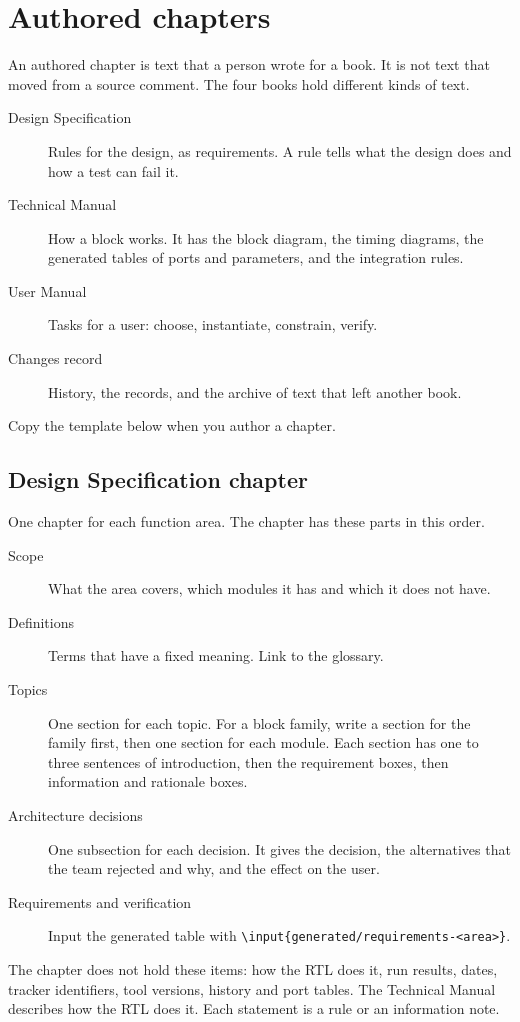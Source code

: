\section{Authored chapters}\label{um:guide:authored-chapters}
An authored chapter is text that a person wrote for a book. It is not text that moved from a source comment. The four books hold different kinds of text.
\begin{description}
  \item[Design Specification] Rules for the design, as requirements. A rule tells what the design does and how a test can fail it.
  \item[Technical Manual] How a block works. It has the block diagram, the timing diagrams, the generated tables of ports and parameters, and the integration rules.
  \item[User Manual] Tasks for a user: choose, instantiate, constrain, verify.
  \item[Changes record] History, the records, and the archive of text that left another book.
\end{description}
Copy the template below when you author a chapter.

\subsection{Design Specification chapter}
One chapter for each function area. The chapter has these parts in this order.
\begin{description}
  \item[Scope] What the area covers, which modules it has and which it does not have.
  \item[Definitions] Terms that have a fixed meaning. Link to the glossary.
  \item[Topics] One section for each topic. For a block family, write a section for the family first, then one section for each module. Each section has one to three sentences of introduction, then the requirement boxes, then information and rationale boxes.
  \item[Architecture decisions] One subsection for each decision. It gives the decision, the alternatives that the team rejected and why, and the effect on the user.
  \item[Requirements and verification] Input the generated table with \texttt{\textbackslash input\{generated/requirements-<area>\}}.
\end{description}
The chapter does not hold these items: how the RTL does it, run results, dates, tracker identifiers, tool versions, history and port tables. The Technical Manual describes how the RTL does it. Each statement is a rule or an information note.

